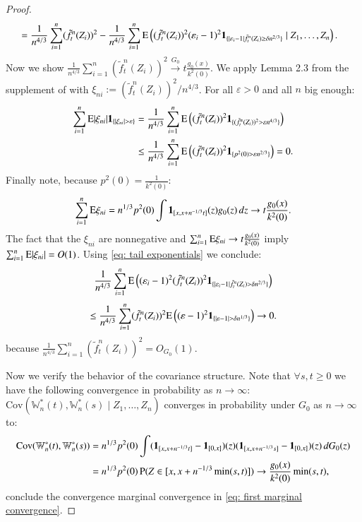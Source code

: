 \begin{proof}
\begin{align*}
	&= \frac{1}{n^{4/3}} \sum_{i=1}^n (\tilde{f}_t^n(Z_i))^2 - \frac{1}{n^{4/3}} \sum_{i=1}^n \mathrm{E} \left( (\tilde{f}_t^n(Z_i))^2 (\varepsilon_i-1)^2 \mathbf{1}_{\{|\varepsilon_i-1|\tilde{f}_t^n(Z_i) \ge \delta n^{2/3}\}} \mid Z_1, \dots, Z_n \right).
\end{align*}
Now we show $\frac{1}{n^{4/3}} \sum_{i=1}^n (\tilde{f}_t^n(Z_i))^2 \xrightarrow{G_0} t \frac{g_0(x)}{k^2(0)}$. We apply Lemma 2.3 from the supplement of \cite{65} with $\xi_{ni} := (\tilde{f}_t^n(Z_i))^2 / n^{4/3}$. For all $\varepsilon > 0$ and all $n$ big enough:
\begin{align*} 
	\sum_{i=1}^n \mathrm{E} |\xi_{ni}| \mathbf{1}_{\{|\xi_{ni}| > \varepsilon\}} &= \frac{1}{n^{4/3}} \sum_{i=1}^n \mathrm{E} \left( (\tilde{f}_t^n(Z_i))^2 \mathbf{1}_{\{(\tilde{f}_t^n(Z_i))^2 > \varepsilon n^{4/3}\}} \right) \\ 
	&\le \frac{1}{n^{4/3}} \sum_{i=1}^n \mathrm{E} \left( (\tilde{f}_t^n(Z_i))^2 \mathbf{1}_{\{p^2(0) > \varepsilon n^{2/3}\}} \right) = 0. 
\end{align*}
Finally note, because $p^2(0) = \frac{1}{k^2(0)}$:
\[ \sum_{i=1}^n \mathrm{E} \xi_{ni} = n^{1/3} p^2(0) \int \mathbf{1}_{[x, x+n^{-1/3}t]}(z) g_0(z) \, dz \to t \frac{g_0(x)}{k^2(0)}. \]
The fact that the $\xi_{ni}$ are nonnegative and $\sum_{i=1}^n \mathrm{E} \xi_{ni} \to t \frac{g_0(x)}{k^2(0)}$
imply $\sum_{i=1}^n \mathrm{E} |\xi_{ni}| = O(1)$. Using \eqref{eq: tail exponentials} we conclude:
\[ \frac{1}{n^{4/3}} \sum_{i=1}^n \mathrm{E} \left( (\varepsilon_i-1)^2 (\tilde{f}_t^n(Z_i))^2 \mathbf{1}_{\{|\varepsilon_i-1|\tilde{f}_t^n(Z_i) > \delta n^{2/3}\}} \right) \]
\[ \le \frac{1}{n^{4/3}} \sum_{i=1}^n (\tilde{f}_t^n(Z_i))^2 \mathrm{E} \left( (\varepsilon-1)^2 \mathbf{1}_{\{|\varepsilon-1| > \delta n^{1/3}\}} \right) \to 0. \]
because $\frac{1}{n^{4/3}} \sum_{i=1}^n (\tilde{f}_t^n(Z_i))^2 = O_{\scriptscriptstyle{G_0}}(1)$.

Now we verify the behavior of the covariance structure. Note that 
$\forall s, t \geq 0$ we have the following convergence in probability as $n \rightarrow \infty$: $\mathrm{Cov}(\mathbb{W}_n^*(t), \mathbb{W}_n^*(s) \mid Z_1, \dots, Z_n)$ converges in probability under $G_0$ as $n \rightarrow \infty$ to:
\begin{align*} 
	\mathrm{Cov}(\mathbb{W}_n^*(t), \mathbb{W}_n^*(s)) &= n^{1/3} p^2(0) \int (\mathbf{1}_{[x, x+n^{-1/3}t]} - \mathbf{1}_{[0,x]})(z) (\mathbf{1}_{[x, x+n^{-1/3}s]} - \mathbf{1}_{[0,x]})(z) \, dG_0(z) \\ &= n^{1/3} p^2(0) \, \mathrm{P} (Z \in [x, x+n^{-1/3} \min(s,t)]) \to  \frac{g_0(x)}{k^2(0)} \min(s,t),
\end{align*}
conclude the convergence marginal convergence in \eqref{eq: first marginal convergence}.


\end{proof}
